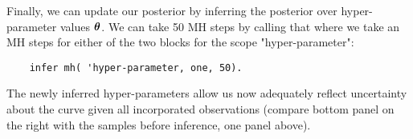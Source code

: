 Finally, we can update our posterior by inferring the posterior over hyper-parameter values $\bm{\theta}$.
We can take 50 \ac{MH} steps by calling that where we take an \ac{MH} steps for either of the two blocks for the scope "hyper-parameter": 
   \begin{lstlisting}
    infer mh( 'hyper-parameter, one, 50).
    \end{lstlisting}
The newly inferred hyper-parameters allow us now adequately reflect uncertainty about the curve given all incorporated observations (compare bottom panel on the right with the samples before inference, one panel above).

